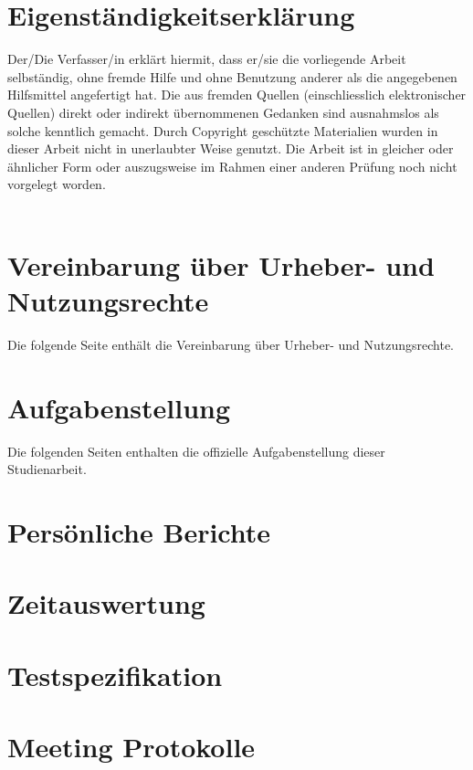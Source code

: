 \documentclass[11pt,a4paper,english,oneside]{book}
\numberwithin{equation}{chapter}
\begin{document}
	\printglossary
	\glsaddall
	
	\printbibliography[heading=bibintoc]
	
	{
		\hypersetup{linkcolor=black}
		\listoffigures
	}
	
	{
		\hypersetup{linkcolor=black}
		\listoftables
	}
	
	
	
	\chapter{Eigenständigkeitserklärung}
	Der/Die Verfasser/in erklärt hiermit, dass er/sie die vorliegende Arbeit selbständig, ohne fremde Hilfe und ohne Benutzung anderer als die angegebenen Hilfsmittel angefertigt hat. Die aus fremden Quellen (einschliesslich elektronischer Quellen) direkt oder indirekt übernommenen Gedanken sind ausnahmslos als solche kenntlich gemacht. Durch Copyright geschützte Materialien wurden in dieser Arbeit nicht in unerlaubter Weise genutzt. Die Arbeit ist in gleicher oder ähnlicher Form oder auszugsweise im Rahmen einer anderen Prüfung noch nicht vorgelegt worden.\\[2cm]
	 \hfill {}
	\hfill \\[2cm]
	 \hfill {}
	
	\chapter{Vereinbarung über Urheber- und Nutzungsrechte}
	Die folgende Seite enthält die Vereinbarung über Urheber- und Nutzungsrechte.
	

	
	\chapter{Aufgabenstellung}
	\label{aufgabenstellung}
	Die folgenden Seiten enthalten die offizielle Aufgabenstellung dieser Studienarbeit.
	
    


	\chapter{Persönliche Berichte}
	\label{erfahrungsberichte}
	
	\chapter{Zeitauswertung}
	\label{zeitauswertung}
	
	\chapter{Testspezifikation}
	
	\chapter{Meeting Protokolle} \label{ch:minutes}
	
	
	
\end{document}
